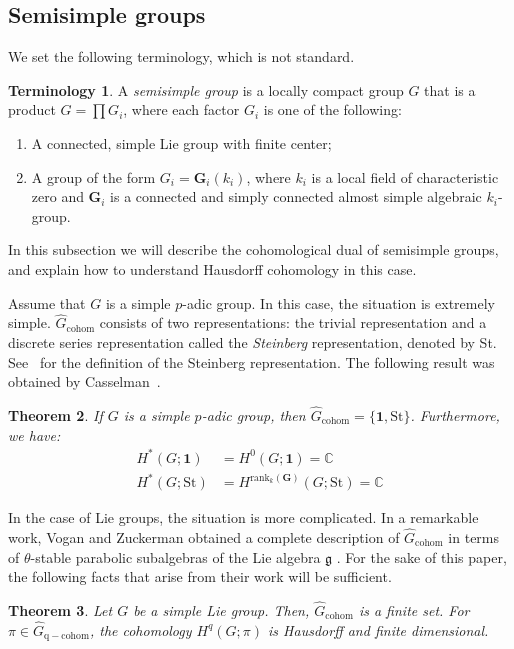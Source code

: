 \documentclass[12pt,reqno]{amsart}
\newtheorem{theorem}{Theorem}[section]
\theoremstyle{definition}
\newtheorem{terminology}[theorem]{Terminology}
\begin{document}
\subsection{Semisimple groups} \label{subsec:Semisimple groups}
We set the following terminology, which is not standard.
\begin{terminology}\label{terminology:semisimple}
    A \emph{semisimple group} is a locally compact group $G$  that is a product $G=\prod G_i$, where each factor $G_i$ is one of the following:
    \begin{enumerate}
        \item A connected, simple Lie group with finite center;
        \item A group of the form $G_i=\mathbf{G}_i(k_i)$, where $k_i$ is a local field of characteristic zero and $\mathbf{G}_i$ is a connected and simply connected almost simple algebraic $k_i$-group.
    \end{enumerate} 
\end{terminology}
In this subsection we will describe the cohomological dual of semisimple groups, and explain how to understand Hausdorff cohomology in this case.

Assume that $G$ is a simple $p$-adic group. In this case, the situation is extremely simple. $\widehat{G}_{\mathrm{cohom}}$ consists of two representations: the trivial representation and a discrete series representation called the \emph{Steinberg} representation, denoted by St. See~\cite{Casselman_SteinbergRep} for the definition of the Steinberg representation. The following result was obtained by Casselman~\cite{Casselman_cohom_padic}.
\begin{theorem}\label{thm:cass_padic}
    If $G$ is a simple $p$-adic group, then $\widehat{G}_{\mathrm{cohom}}=\{\mathbf{1},\mathrm{St\}}$. Furthermore, we have:
    \begin{align*}
    H^*(G;\mathbf{1})&=H^0(G;\mathbf{1})=\mathbb{C}\\
    H^*(G;\mathrm{St})&=H^{\mathrm{rank}_k(\mathbf{G})}(G;\mathrm{St})=\mathbb{C}
    \end{align*}
\end{theorem}

In the case of Lie groups, the situation is more complicated. In a remarkable work, Vogan and Zuckerman obtained a complete description of $\widehat{G}_\mathrm{cohom}$ in terms of $\theta$-stable parabolic subalgebras of the Lie algebra $\mathfrak{g}$  \cite{VZ}. For the sake of this paper, the following facts that arise from their work will be sufficient.
\begin{theorem}\label{thm:vogan-zuckerman}
    Let $G$ be a simple Lie group. Then, $\widehat{G}_{\mathrm{cohom}}$ is a finite set. For $\pi \in \widehat{G}_{\mathrm{q-cohom}}$, the cohomology $H^q(G;\pi)$ is Hausdorff and finite dimensional.
\end{theorem}
\end{document}
